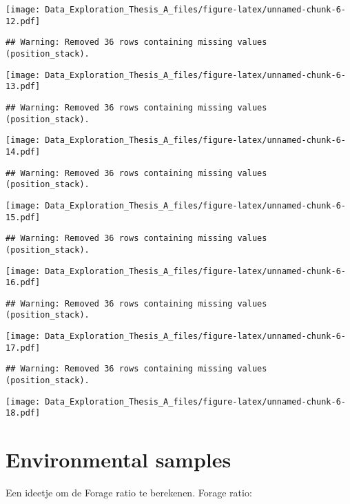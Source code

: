 \documentclass[]{article}
\begin{document}
\texttt{[image: Data\_Exploration\_Thesis\_A\_files/figure-latex/unnamed-chunk-6-12.pdf]}

\begin{verbatim}
## Warning: Removed 36 rows containing missing values (position_stack).
\end{verbatim}

\texttt{[image: Data\_Exploration\_Thesis\_A\_files/figure-latex/unnamed-chunk-6-13.pdf]}

\begin{verbatim}
## Warning: Removed 36 rows containing missing values (position_stack).
\end{verbatim}

\texttt{[image: Data\_Exploration\_Thesis\_A\_files/figure-latex/unnamed-chunk-6-14.pdf]}

\begin{verbatim}
## Warning: Removed 36 rows containing missing values (position_stack).
\end{verbatim}

\texttt{[image: Data\_Exploration\_Thesis\_A\_files/figure-latex/unnamed-chunk-6-15.pdf]}

\begin{verbatim}
## Warning: Removed 36 rows containing missing values (position_stack).
\end{verbatim}

\texttt{[image: Data\_Exploration\_Thesis\_A\_files/figure-latex/unnamed-chunk-6-16.pdf]}

\begin{verbatim}
## Warning: Removed 36 rows containing missing values (position_stack).
\end{verbatim}

\texttt{[image: Data\_Exploration\_Thesis\_A\_files/figure-latex/unnamed-chunk-6-17.pdf]}

\begin{verbatim}
## Warning: Removed 36 rows containing missing values (position_stack).
\end{verbatim}

\texttt{[image: Data\_Exploration\_Thesis\_A\_files/figure-latex/unnamed-chunk-6-18.pdf]}

\section{Environmental samples}\label{environmental-samples}

Een ideetje om de Forage ratio te berekenen. Forage ratio:
\end{document}
